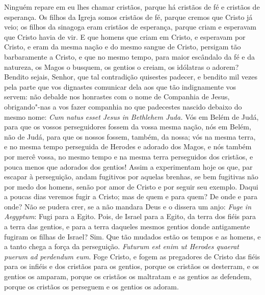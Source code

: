 Ninguém repare em eu lhes chamar cristãos, parque há cristãos de fé e
cristãos de esperança. Os filhos da Igreja somos cristãos de fé, parque
cremos que Cristo já veio; os filhos da sinagoga eram cristãos de
esperança, parque criam e esperavam que Cristo havia de vir. E que
homens que criam em Cristo, e esperavam por Cristo, e eram da mesma
nação e do mesmo sangue de Cristo, persigam tão barbaramente a Cristo, e
que no mesmo tempo, para maior escândalo da fé e da natureza, os Magos o
busquem, os gentios o creiam, os idólatras o adorem? Bendito sejais,
Senhor, que tal contradição quisestes padecer, e bendito mil vezes pela
parte que vos dignastes comunicar dela aos que tão indignamente vos
servem: não debalde nos honrastes com o nome de Companhia de Jesus,
obrigando"-nas a vos fazer companhia no que padecestes nascido debaixo do
mesmo nome: \emph{Cum natus esset Jesus in Bethlehem Juda.} Vós em Belém
de Judá, para que os vossos perseguidores fossem da vossa mesma nação,
nós em Belém, não de Judá, para que os nossos fossem, também, da nossa;
vós na mesma terra, e no mesma tempo perseguida de Herodes e adorado dos
Magos, e nós também por mercê vossa, no mesmo tempo e na mesma terra
perseguidos dos cristãos, e pouca menos que adorados dos gentios! Assim
a experimentam hoje os que, par escapar à perseguição, andam fugitivos
por aquelas brenhas, se bem fugitivas não por medo dos homens, senão por
amor de Cristo e por seguir seu exemplo. Daqui a poucas dias veremos
fugir a Cristo; mas de quem e para quem? De onde e para onde? Não se
pudera crer, se a não mandara Deus e o dissera um anjo: \emph{Fuge in
Aegyptum}: Fugi para a Egito. Pois, de Israel para a Egito, %
da terra dos fiéis para a terra das gentios, e para a terra daqueles
mesmos gentios donde antigamente fugiram os filhas de Israel? Sim. Que
tão mudados estão os tempos e as homens, e a tanto chega a força da
perseguição. \emph{Futurum est enim ut Herodes quaerat puerum ad
perdendum eum}.
Foge Cristo, e fogem as pregadores de Cristo das fiéis para os infiéis e
dos cristãos para os gentios, porque os cristãos os desterram, e os
gentios os amparam, porque os cristãos os maltratam e as gentios as
defendem, porque os cristãos os perseguem e os gentios os adoram.


